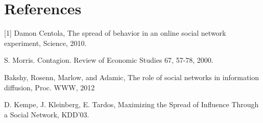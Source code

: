 \documentclass{article}
\begin{document}
\section{References}
%
%
[1] Damon Centola, The spread of behavior in an online social network experiment, Science, 2010.

\noindent [2] S. Morris. Contagion. Review of Economic Studies 67, 57-78, 2000.

\noindent [3] Bakshy, Rosenn, Marlow, and Adamic, The role of social networks in information diffusion, Proc. WWW, 2012

\noindent [4] D. Kempe, J. Kleinberg, E. Tardos, Maximizing the Spread of Influence Through a Social Network, KDD'03.
\end{document}
